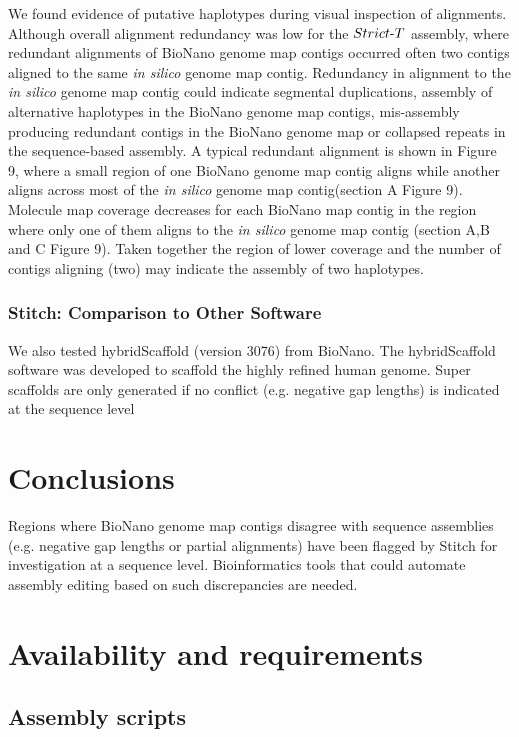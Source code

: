 \documentclass{bmcart}
\begin{document}
We found evidence of putative haplotypes during visual inspection of alignments. Although overall alignment redundancy was low for the $Strict\textnormal{-}T$ assembly, where redundant alignments of BioNano genome map contigs occurred often two contigs aligned to the same \textit{in silico} genome map contig. Redundancy in alignment to the \textit{in silico} genome map contig could indicate segmental duplications, assembly of alternative haplotypes in the BioNano genome map contigs, mis-assembly producing redundant contigs in the BioNano genome map or collapsed repeats in the sequence-based assembly. A typical redundant alignment is shown in Figure 9, where a small region of one BioNano genome map contig aligns while another aligns across most of the \textit{in silico} genome map contig(section A Figure 9). Molecule map coverage decreases for each BioNano map contig in the region where only one of them aligns to the \textit{in silico} genome map contig (section A,B and C Figure 9). Taken together the region of lower coverage and the number of contigs aligning (two) may indicate the assembly of two haplotypes. 

\subsubsection*{Stitch: Comparison to Other Software}

We also tested hybridScaffold (version 3076) from BioNano. The hybridScaffold software was developed to scaffold the highly refined human genome. Super scaffolds are only generated if no conflict (e.g. negative gap lengths) is indicated at the sequence level

\section*{Conclusions}

Regions where BioNano genome map contigs disagree with sequence assemblies (e.g. negative gap lengths or partial alignments) have been flagged by Stitch for investigation at a sequence level. Bioinformatics tools that could automate assembly editing based on such discrepancies are needed. 

\section*{Availability and requirements}

\subsection*{\textbf{Assembly scripts}}
\end{document}
